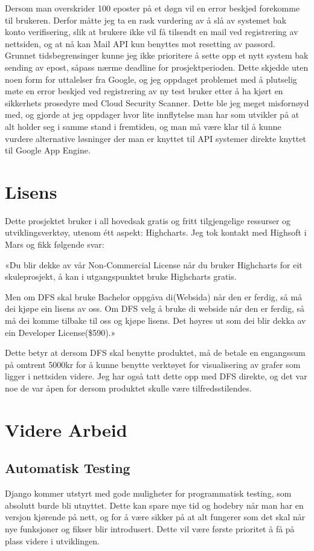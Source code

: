 Dersom man overskrider 100 eposter på et døgn vil en error beskjed forekomme til brukeren. Derfor måtte jeg ta en rask vurdering av å slå av systemet bak konto verifisering, slik at brukere ikke vil få tilsendt en mail ved registrering av nettsiden, og at nå kan Mail API kun benyttes mot resetting av passord.  Grunnet tidsbegrensinger kunne jeg ikke prioritere å sette opp et nytt system bak sending av epost, såpass nærme deadline for prosjektperioden.
Dette skjedde uten noen form for uttalelser fra Google, og jeg oppdaget problemet med å plutselig møte en error beskjed ved registrering av ny test bruker etter å ha kjørt en sikkerhets prosedyre med Cloud Security Scanner. Dette ble jeg meget misfornøyd med, og gjorde at jeg oppdager hvor lite innflytelse man har som utvikler på at alt holder seg i samme stand i fremtiden, og man må være klar til å kunne vurdere alternative løsninger der man er knyttet til API systemer direkte knyttet til Google App Engine. 


\section{Lisens}
Dette prosjektet bruker i all hovedsak gratis og fritt tilgjengelige ressurser og utviklingsverktøy, utenom étt aspekt: Highcharts. Jeg tok kontakt med Highsoft i Mars og fikk følgende svar:

«Du blir dekke av vår Non-Commercial License når du bruker Highcharts for eit skuleprosjekt, å kan i utgangspunktet bruke Highcharts gratis. 

Men om DFS skal bruke Bachelor oppgåva di(Websida) når den er ferdig, så må dei kjøpe ein lisens av oss. Om DFS velg å bruke di webside når den er ferdig, så må dei komme tilbake til oss og kjøpe lisens. Det høyres ut som dei blir dekka av ein Developer License(\$590).»

Dette betyr at dersom DFS skal benytte produktet, må de betale en engangssum på omtrent 5000kr for å kunne benytte verktøyet for visualisering av grafer som ligger i nettsiden videre. Jeg har også tatt dette opp med DFS direkte, og det var noe de var åpen for dersom produktet skulle være tilfredsstilendes.




\section{Videre Arbeid}
\subsection{Automatisk Testing}
Django kommer utstyrt med gode muligheter for programmatisk testing, som absolutt burde bli utnyttet. Dette kan spare mye tid og hodebry når man har en versjon kjørende på nett, og for å være sikker på at alt fungerer som det skal når nye funksjoner og fikser blir introdusert. Dette vil være første prioritet å få på plass videre i utviklingen.


